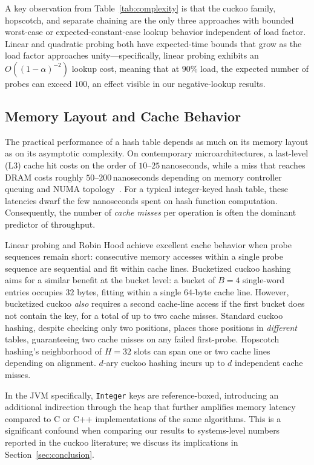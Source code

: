 \documentclass[10pt,journal,compsoc]{IEEEtran}
\begin{document}
A key observation from Table~\ref{tab:complexity} is that the cuckoo family, hopscotch, and separate chaining are the only three approaches with bounded worst-case or expected-constant-case lookup behavior independent of load factor. Linear and quadratic probing both have expected-time bounds that grow as the load factor approaches unity---specifically, linear probing exhibits an $O((1-\alpha)^{-2})$ lookup cost, meaning that at $90\%$ load, the expected number of probes can exceed $100$, an effect visible in our negative-lookup results.

\subsection{Memory Layout and Cache Behavior}
The practical performance of a hash table depends as much on its memory layout as on its asymptotic complexity. On contemporary microarchitectures, a last-level (L3) cache hit costs on the order of $10$--$25$\,nanoseconds, while a miss that reaches DRAM costs roughly $50$--$200$\,nanoseconds depending on memory controller queuing and NUMA topology~\cite{hennessy2017computer,intel_optref}. For a typical integer-keyed hash table, these latencies dwarf the few nanoseconds spent on hash function computation. Consequently, the number of \emph{cache misses} per operation is often the dominant predictor of throughput.

Linear probing and Robin Hood achieve excellent cache behavior when probe sequences remain short: consecutive memory accesses within a single probe sequence are sequential and fit within cache lines. Bucketized cuckoo hashing aims for a similar benefit at the bucket level: a bucket of $B=4$ single-word entries occupies $32$ bytes, fitting within a single $64$-byte cache line. However, bucketized cuckoo \emph{also} requires a second cache-line access if the first bucket does not contain the key, for a total of up to two cache misses. Standard cuckoo hashing, despite checking only two positions, places those positions in \emph{different} tables, guaranteeing two cache misses on any failed first-probe. Hopscotch hashing's neighborhood of $H=32$ slots can span one or two cache lines depending on alignment. $d$-ary cuckoo hashing incurs up to $d$ independent cache misses.

In the JVM specifically, \texttt{Integer} keys are reference-boxed, introducing an additional indirection through the heap that further amplifies memory latency compared to C or C++ implementations of the same algorithms. This is a significant confound when comparing our results to systems-level numbers reported in the cuckoo literature; we discuss its implications in Section~\ref{sec:conclusion}.
\end{document}
